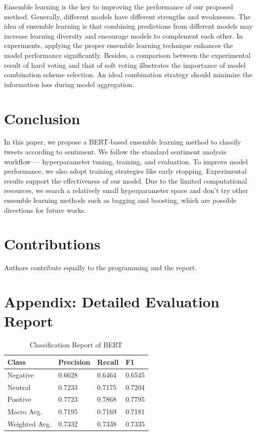 \documentclass[runningheads]{llncs}
\begin{document}
Ensemble learning is the key to improving the performance of our proposed method. Generally, different models have different strengths and weaknesses. The idea of ensemble learning is that combining predictions from different models may increase learning diversity and encourage models to complement each other. In experiments, applying the proper ensemble learning technique enhances the model performance significantly. Besides, a comparison between the experimental result of hard voting and that of soft voting illustrates the importance of model combination scheme selection. An ideal combination strategy should minimize the information loss during model aggregation.

\section{Conclusion}
In this paper, we propose a BERT-based ensemble learning method to classify tweets according to sentiment. We follow the standard sentiment analysis workflow --- hyperparameter tuning, training, and evaluation. To improve model performance, we also adopt training strategies like early stopping. Experimental results support the effectiveness of our model. Due to the limited computational resources, we search a relatively small hyperparameter space and don't try other ensemble learning methods such as bagging and boosting, which are possible directions for future works.
 
\section{Contributions}
Authors contribute equally to the programming and the report.

%
%


%

\section*{Appendix: Detailed Evaluation Report}
\begin{table}[!ht]
    \centering
    \caption{Classification Report of BERT}
    \begin{tabular}{llll}
        \toprule
        \textbf{Class} & \textbf{Precision} & \textbf{Recall} & \textbf{F1}\\
        \midrule
         Negative       & 0.6628  & 0.6464  & 0.6545 \\ 
         Neutral       & 0.7233  & 0.7175  & 0.7204 \\
         Positive       & 0.7723  & 0.7868  & 0.7795 \\
        \midrule
   Macro Avg.  & 0.7195  & 0.7169  & 0.7181 \\
Weighted Avg.  & 0.7332  & 0.7338  & 0.7335 \\
        \bottomrule
    \end{tabular}
\end{table}
\end{document}
